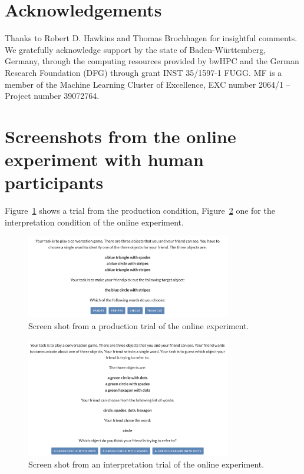 \documentclass[fleqn]{article}
\begin{document}
\section*{Acknowledgements}
Thanks to Robert D. Hawkins and Thomas Brochhagen for insightful comments.
We gratefully acknowledge support by the state of Baden-Württemberg, Germany, through the computing resources provided by bwHPC and the German Research Foundation (DFG) through grant INST 35/1597-1 FUGG.
MF is a member of the Machine Learning Cluster of Excellence, EXC number 2064/1 – Project number 39072764.

\printbibliography[heading=bibintoc]

\newpage
\appendix



\section{Screenshots from the online experiment with human participants}
\label{sec:scre-from-online}

Figure~\ref{fig:refgame-screenshot-production} shows a trial from the production condition, Figure~\ref{fig:refgame-screenshot-interpretation} one for the interpretation condition of the online experiment.

\begin{figure}[H]
  \centering
  \includegraphics[width = 0.8\textwidth]{00-pics/refgame-production.png}

  \caption{Screen shot from a production trial of the online experiment.}
  \label{fig:refgame-screenshot-production}
\end{figure}

\begin{figure}[H]
  \centering
  \includegraphics[width = 0.8\textwidth]{00-pics/refgame-interpretation.png}

  \caption{Screen shot from an interpretation trial of the online experiment.}
  \label{fig:refgame-screenshot-interpretation}
\end{figure}
\end{document}
